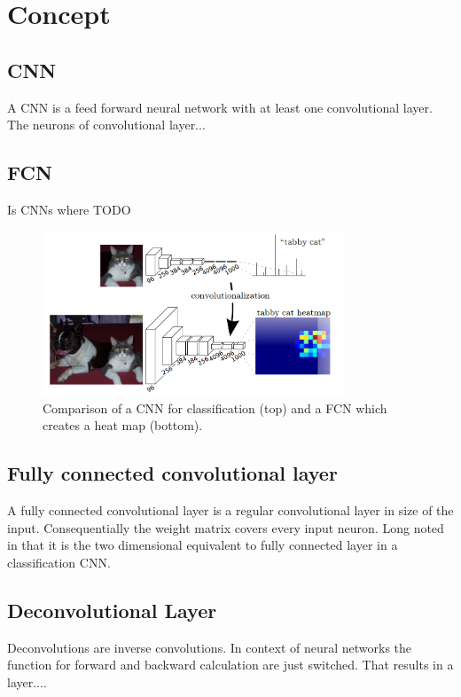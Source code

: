\section{Concept}\label{sec:concept}
\subsection{CNN}
A \gls{CNN} is a feed forward neural network with at least one convolutional
layer. The neurons of convolutional layer...

\subsection{FCN}
Is \glspl{CNN} where TODO
\begin{figure}[htb]
	\centering
	\includegraphics[width=9cm]{figures/fcnn}
	\caption{Comparison of a \gls{CNN} for classification (top) and a FCN which creates a heat map (bottom). \cite{long2014fully}}
\end{figure}

\subsection{Fully connected convolutional layer}
A fully connected convolutional layer is a regular convolutional layer in size
of the input. Consequentially the weight matrix covers every input neuron. Long
noted in \cite{long2014fully} that it is the two dimensional equivalent to
fully connected layer in a classification \gls{CNN}.

\subsection{Deconvolutional Layer}
Deconvolutions are inverse convolutions. In context of neural networks the
function for forward and backward calculation are just switched. That results
in a layer....
